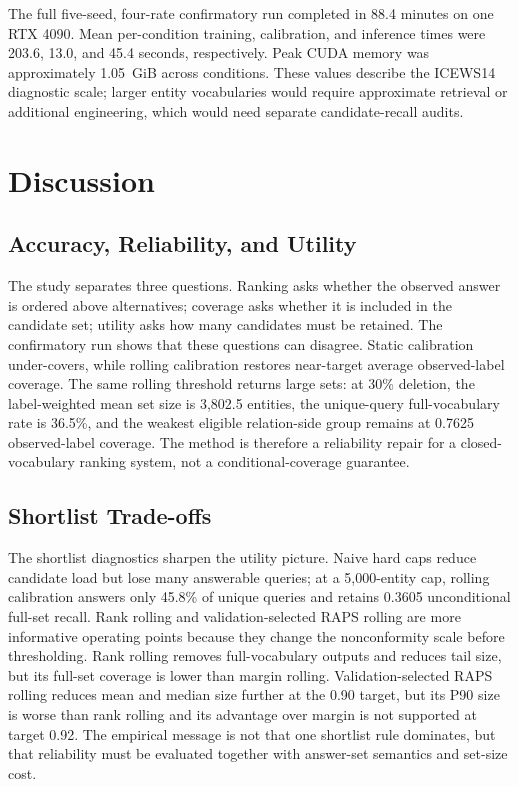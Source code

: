 \documentclass[information,article,submit,oneauthor,pdftex]{Definitions/mdpi}
\begin{document}
The full five-seed, four-rate confirmatory run completed in 88.4 minutes on one
RTX 4090. Mean per-condition training, calibration, and inference times were
203.6, 13.0, and 45.4 seconds, respectively. Peak CUDA memory was approximately
1.05~GiB across conditions. These values describe the ICEWS14 diagnostic scale;
larger entity vocabularies would require approximate retrieval or additional
engineering, which would need separate candidate-recall audits.

\FloatBarrier

\section{Discussion}
\label{sec:discussion}

\subsection{Accuracy, Reliability, and Utility}

The study separates three questions. Ranking asks whether the observed answer
is ordered above alternatives; coverage asks whether it is included in the
candidate set; utility asks how many candidates must be retained. The
confirmatory run shows that these questions can disagree. Static calibration
under-covers, while rolling calibration restores near-target average
observed-label coverage. The same rolling threshold returns large sets: at
30\% deletion, the label-weighted mean set size is 3,802.5 entities, the
unique-query full-vocabulary rate is 36.5\%, and the weakest eligible
relation-side group remains at 0.7625 observed-label coverage. The method is
therefore a reliability repair for a closed-vocabulary ranking system, not a
conditional-coverage guarantee.

\subsection{Shortlist Trade-offs}

The shortlist diagnostics sharpen the utility picture. Naive hard caps reduce
candidate load but lose many answerable queries; at a 5,000-entity cap, rolling
calibration answers only 45.8\% of unique queries and retains 0.3605
unconditional full-set recall. Rank rolling and validation-selected RAPS rolling
are more informative operating points because they change the nonconformity
scale before thresholding. Rank rolling removes full-vocabulary outputs and
reduces tail size, but its full-set coverage is lower than margin rolling.
Validation-selected RAPS rolling reduces mean and median size further at the
0.90 target, but its P90 size is worse than rank rolling and its advantage over
margin is not supported at target 0.92. The empirical message is not that one
shortlist rule dominates, but that reliability must be evaluated together with
answer-set semantics and set-size cost.
\end{document}
